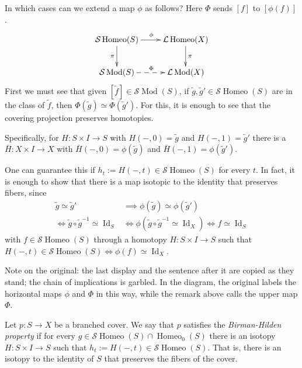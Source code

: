 In which cases can we extend a map
$\phi$ as follows? Here $\Phi$ sends
$[f]$ to $[\phi(f)]$.
$$
\xymatrix{
\mathcal{S}\operatorname{Homeo}(S)
  \ar[r]^{\phi} \ar[d]_{\pi}
  & \mathcal{L}\operatorname{Homeo}(X)
    \ar[d]^{\pi} \\
\mathcal{S}\operatorname{Mod}(S)
  \ar@{-->}[r]^{\Phi}
  & \mathcal{L}\operatorname{Mod}(X)
}
$$
First we must see that given
$[\tilde{f}]\in
\mathcal{S}\operatorname{Mod}(S)$,
if
$\tilde{g},\tilde{g}'\in
\mathcal{S}\operatorname{Homeo}(S)$
are in the class of $\tilde{f}$, then
$\Phi(\tilde{g})\simeq
\Phi(\tilde{g}')$.
For this, it is enough to see that the
covering projection preserves
homotopies.

Specifically, for $H:S\times I\to S$
with $H(-,0)=\tilde{g}$ and
$H(-,1)=\tilde{g}'$ there is a
$\bar{H}:X\times I\to X$ with
$\bar{H}(-,0)=\phi(\tilde{g})$ and
$\bar{H}(-,1)=\phi(\tilde{g}')$.

One can guarantee this if
$h_t:=H(-,t)\in
\mathcal{S}\operatorname{Homeo}(S)$
for every $t$. In fact, it is enough to
show that there is a map isotopic to the
identity that preserves fibers, since
$$
\begin{aligned}
\tilde{g}\simeq\tilde{g}'
&\implies\phi(\tilde{g})
\simeq\phi(\tilde{g}')\\
\iff\tilde{g}\circ\tilde{g}^{-1}
\simeq\operatorname{Id}_S
&\iff\phi(\tilde{g}\circ\tilde{g}^{-1}
\simeq\operatorname{Id}_X)
\iff f\simeq\operatorname{Id}_S
\end{aligned}
$$
with
$f\in\mathcal{S}\operatorname{Homeo}(S)$
through a homotopy $H:S\times I\to S$
such that
$H(-,t)\in
\mathcal{S}\operatorname{Homeo}(S)
\iff\phi(f)\simeq\operatorname{Id}_X$.

Note on the original: the last display
and the sentence after it are copied as
they stand; the chain of implications is
garbled. In the diagram, the original
labels the horizontal maps $\phi$ and
$\Phi$ in this way, while the remark
above calls the upper map $\Phi$.

\begin{definition}
\label{definition-birman-hilden-property}
Let $p:S\to X$ be a branched cover. We
say that $p$ satisfies the
{\it Birman-Hilden property} if for
every
$g\in\mathcal{S}\operatorname{Homeo}(S)
\cap\operatorname{Homeo}_0(S)$
there is an isotopy $H:S\times I\to S$
such that
$h_t:=H(-,t)\in
\mathcal{S}\operatorname{Homeo}(S)$.
That is, there is an isotopy to the
identity of $S$ that preserves the
fibers of the cover.
\end{definition}

